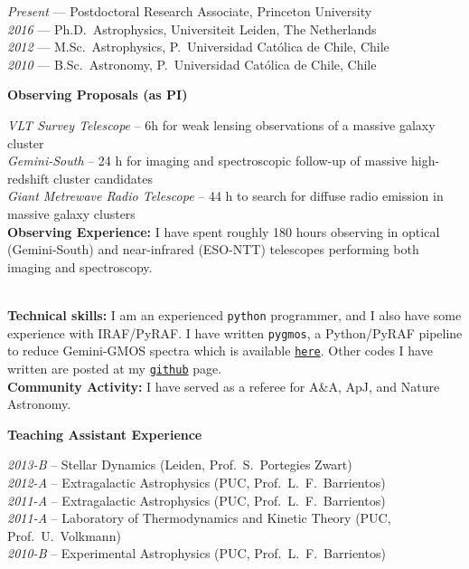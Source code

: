 \documentclass[11pt]{article}
\newcommand\technical[2]{
  \noindent
    {\large\bf #1:} #2\\
  }
\newcommand\sectitle[1]{
  \vspace{0.5cm}
  \noindent
  \textbf{\large #1}\\
  \vspace{-0.2cm}
}
\begin{document}
\noindent
\emph{Present} --- Postdoctoral Research Associate, Princeton University\\
\emph{2016} --- Ph.D.~Astrophysics, Universiteit Leiden, The Netherlands\\
\emph{2012} --- M.Sc.~Astrophysics, P.~Universidad Cat\'olica de Chile, Chile\\
\emph{2010} --- B.Sc.~Astronomy, P.~Universidad Cat\'olica de Chile, Chile


\sectitle{Observing Proposals (as PI)}

\noindent
\emph{VLT Survey Telescope} -- 6h for weak lensing observations of a massive 
galaxy cluster\\
\emph{Gemini-South} -- 24 h for imaging and spectroscopic follow-up of massive 
high-redshift cluster candidates\\
\emph{Giant Metrewave Radio Telescope} -- 44 h to search for diffuse radio 
emission in massive galaxy clusters\\


\technical{Observing Experience}
{I have spent roughly 180 hours observing in 
optical (Gemini-South) and near-infrared (ESO-NTT) telescopes performing both 
imaging and spectroscopy.}\\

\vspace{-0.5cm}
\technical{Technical skills}
{I am an experienced \texttt{python} programmer, and I also have some experience 
with IRAF/PyRAF. I have written {\tt pygmos}, a Python/PyRAF pipeline to reduce 
Gemini-GMOS spectra which is available 
\href{https://github.com/cristobal-sifon/pygmos/}{\texttt{here}}. Other codes I 
have written are posted at my 
\href{https://github.com/cristobal-sifon}{\texttt{github}} page.}


%

\technical{Community Activity}
{I have served as a referee for A\&A, ApJ, and Nature Astronomy.}


\vspace{-0.5cm}
\sectitle{Teaching Assistant Experience}

\noindent
\emph{2013-B} -- Stellar Dynamics (Leiden, Prof.~S.~Portegies Zwart)\\
\emph{2012-A} -- Extragalactic Astrophysics (PUC, Prof.~L.~F.~Barrientos)\\
\emph{2011-A} -- Extragalactic Astrophysics (PUC, Prof.~L.~F.~Barrientos)\\
\emph{2011-A} -- Laboratory of Thermodynamics and Kinetic Theory (PUC, Prof.~U.~Volkmann)\\
\emph{2010-B} -- Experimental Astrophysics (PUC, Prof.~L.~F.~Barrientos)
\end{document}
